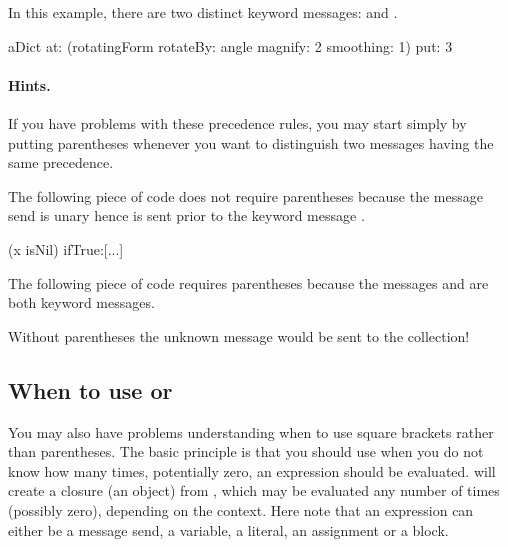 \documentclass[a4paper,10pt,twoside]{book}
\begin{document}
In this example, there are two distinct keyword messages:   and .

\begin{code}{}
aDict
   at: (rotatingForm 
          rotateBy: angle	
          magnify: 2 
          smoothing: 1)
   put: 3
\end{code}



\paragraph{Hints.} If you have problems with these precedence rules, you may start simply by putting parentheses whenever you want to distinguish two messages having the same precedence.

The following piece of code does not require parentheses because the message send   is unary hence is sent prior to the keyword message .
\begin{code}{}
(x isNil)
   ifTrue:[...]
\end{code}

The following piece of code requires parentheses because the messages  and  are both keyword messages. 
\noindent
Without parentheses the unknown message  would be sent to the collection!

\subsection{When to use \lct{[ ]} or \lct{( )}}
You may also have problems understanding when to use square brackets rather than parentheses.
The basic principle is that you should use \ct{[ ]} when you do not know how many times, potentially zero, an expression should be evaluated.
 will create a  closure (\ie an object) from , which may be evaluated any number of times (possibly zero), depending on the context. Here note that an expression can either be a message send, a variable, a literal, an assignment or a block.
\end{document}
